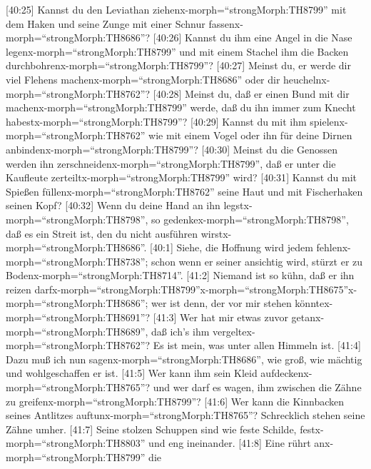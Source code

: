  {[}40:25{]} Kannst du den Leviathan
ziehenx-morph=``strongMorph:TH8799'' mit dem Haken und seine Zunge mit
einer Schnur fassenx-morph=``strongMorph:TH8686''? 
{[}40:26{]} Kannst du ihm eine Angel in die Nase
legenx-morph=``strongMorph:TH8799'' und mit einem Stachel ihm die Backen
durchbohrenx-morph=``strongMorph:TH8799''?  {[}40:27{]}
Meinst du, er werde dir viel Flehens
machenx-morph=``strongMorph:TH8686'' oder dir
heuchelnx-morph=``strongMorph:TH8762''?  {[}40:28{]} Meinst
du, daß er einen Bund mit dir machenx-morph=``strongMorph:TH8799''
werde, daß du ihn immer zum Knecht habestx-morph=``strongMorph:TH8799''?
 {[}40:29{]} Kannst du mit ihm
spielenx-morph=``strongMorph:TH8762'' wie mit einem Vogel oder ihn für
deine Dirnen anbindenx-morph=``strongMorph:TH8799''? 
{[}40:30{]} Meinst du die Genossen werden ihn
zerschneidenx-morph=``strongMorph:TH8799'', daß er unter die Kaufleute
zerteiltx-morph=``strongMorph:TH8799'' wird?  {[}40:31{]}
Kannst du mit Spießen füllenx-morph=``strongMorph:TH8762'' seine Haut
und mit Fischerhaken seinen Kopf?  {[}40:32{]} Wenn du deine
Hand an ihn legstx-morph=``strongMorph:TH8798'', so
gedenkex-morph=``strongMorph:TH8798'', daß es ein Streit ist, den du
nicht ausführen wirstx-morph=``strongMorph:TH8686''. 
{[}40:1{]} Siehe, die Hoffnung wird jedem
fehlenx-morph=``strongMorph:TH8738''; schon wenn er seiner ansichtig
wird, stürzt er zu Bodenx-morph=``strongMorph:TH8714''. 
{[}41:2{]} Niemand ist so kühn, daß er ihn reizen
darfx-morph=``strongMorph:TH8799''\textbar x-morph=``strongMorph:TH8675''x-morph=``strongMorph:TH8686'';
wer ist denn, der vor mir stehen könntex-morph=``strongMorph:TH8691''?
 {[}41:3{]} Wer hat mir etwas zuvor
getanx-morph=``strongMorph:TH8689'', daß ich's ihm
vergeltex-morph=``strongMorph:TH8762''? Es ist mein, was unter allen
Himmeln ist.  {[}41:4{]} Dazu muß ich nun
sagenx-morph=``strongMorph:TH8686'', wie groß, wie mächtig und
wohlgeschaffen er ist.  {[}41:5{]} Wer kann ihm sein Kleid
aufdeckenx-morph=``strongMorph:TH8765''? und wer darf es wagen, ihm
zwischen die Zähne zu greifenx-morph=``strongMorph:TH8799''?
 {[}41:6{]} Wer kann die Kinnbacken seines Antlitzes
auftunx-morph=``strongMorph:TH8765''? Schrecklich stehen seine Zähne
umher.  {[}41:7{]} Seine stolzen Schuppen sind wie feste
Schilde, festx-morph=``strongMorph:TH8803'' und eng ineinander.
 {[}41:8{]} Eine rührt anx-morph=``strongMorph:TH8799'' die
